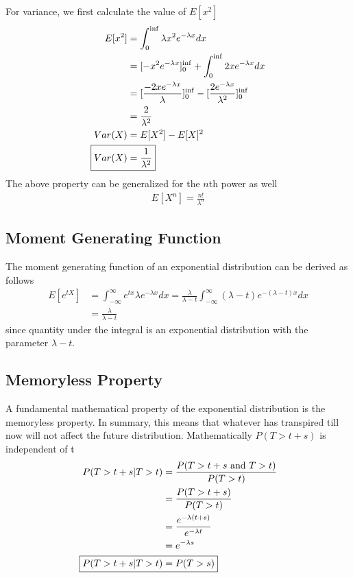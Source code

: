 \documentclass[../../probability-notes.tex]{subfiles}
\begin{document}
    For variance, we first calculate the value of $E[x^{2}]$
    \begin{align*}
        E[x^{2}] &= \int_{0}^{\inf} \lambda x^{2} e^{-\lambda x} dx\\
        &= [-x^{2} e^{-\lambda x}]_{0}^{\inf} + \int_{0}^{\inf} 2x e^{-\lambda x} dx\\
        &= [\frac{-2x e^{-\lambda x}}{\lambda}]_{0}^{\inf} - [\frac{2e^{-\lambda x}}{\lambda^{2}}]_{0}^{\inf}\\
        &= \frac{2}{\lambda^{2}}\\
        Var(X) &= E[X^{2}] - E[X]^{2}\\
        \Aboxed{Var(X) &= \frac{1}{\lambda^{2}}}
    \end{align*}
    The above property can be generalized for the $n$th power as well
    \begin{align*}
        E[X^{n}] = \frac{n!}{\lambda^{n}}
    \end{align*}

    \subsection{Moment Generating Function}
    The moment generating function of an exponential distribution can be derived as follows
    \begin{align*}
        E[e^{tX}] &= \int_{-\infty}^{\infty} e^{tx} \lambda e^{-\lambda x} dx = \frac{\lambda}{\lambda - t} \int_{-\infty}^{\infty} (\lambda - t) e^{-(\lambda - t)x} dx\\
        &= \frac{\lambda}{\lambda - t}
    \end{align*}
    since quantity under the integral is an exponential distribution with the parameter $\lambda - t$.

    \subsection{Memoryless Property}
    A fundamental mathematical property of the exponential distribution is the memoryless property. In summary, this means that whatever has transpired till now will not affect the future distribution. Mathematically $P(T > t+s)$ is independent of t
    \begin{align*}
        P(T > t+s | T>t) &= \frac{P(T> t+s \text{ and }T > t)}{P(T > t)}\\
        &= \frac{P(T > t + s)}{P(T > t)}\\
        &= \frac{e^{-\lambda(t+s)}}{e^{-\lambda t}}\\
        &= e^{-\lambda s}\\
        \Aboxed{P(T > t+s | T>t) &= P(T > s)}
    \end{align*}
\end{document}
